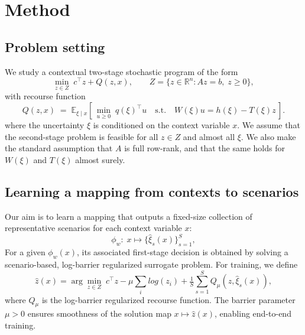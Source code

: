 \documentclass{article}
\begin{document}
\section{Method}


\subsection{Problem setting}
We study a contextual two-stage stochastic program of the form
\begin{equation}
\min_{z \in Z}\; c^\top z + Q(z,x), 
\qquad   
Z = \{z \in \mathbb{R}^n : Az=b,\; z \geq 0\},
\end{equation}
with recourse function
\begin{equation}
Q(z,x) \;=\; \mathbb{E}_{\xi\mid x}\!\left[\,\min_{u\ge 0} \; q(\xi)^\top u \quad \text{s.t.}\quad W(\xi)u = h(\xi) - T(\xi)z \,\right].
\end{equation}
where the uncertainty $\xi$ is conditioned on the context variable $x$.
We assume that the second-stage problem is feasible for all $z \in Z$ and almost all $\xi$.
We also make the standard assumption that $A$ is full row-rank, and that the same holds for $W(\xi)$ and $T(\xi)$ almost surely.

\subsection{Learning a mapping from contexts to scenarios}
Our aim is to learn a mapping that outputs a fixed-size collection of representative scenarios for each context variable $x$:
\begin{equation}
\phi_w: \; x \mapsto \{\hat\xi_s(x)\}_{s=1}^S,
\end{equation} 
For a given $\phi_w(x)$, its associated first-stage decision is obtained by solving a scenario-based, log-barrier regularized 
surrogate problem.
For training, we define
\begin{equation}
\hat z(x) = \arg\min_{z \in Z} \; c^\top z - \mu \sum_i log(z_i) +  \tfrac{1}{S}\sum_{s=1}^S Q_\mu(z,\hat\xi_s(x)),
\end{equation}
where $Q_\mu$ is the log-barrier regularized recourse function. 
The barrier parameter $\mu>0$ ensures smoothness of the solution map $x \mapsto \hat z(x)$, enabling end-to-end training.
\end{document}
